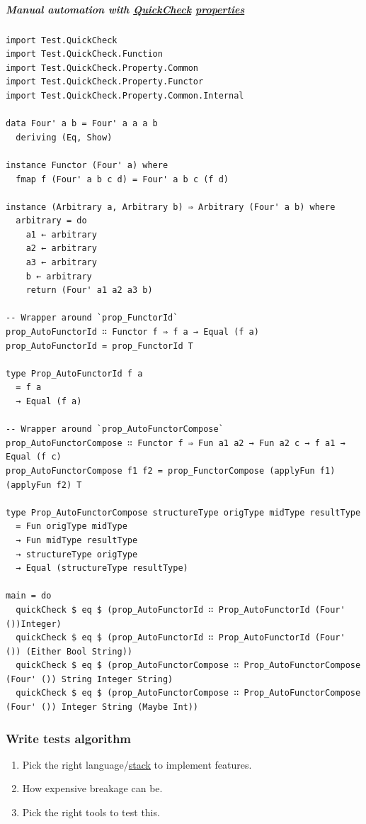 \documentclass[11pt]{article}
\begin{document}
\subparagraph{Manual automation with \hyperref[org85396c2]{QuickCheck} \hyperref[org763ad6b]{properties}}
\label{sec:orgbd34e88}

\begin{verbatim}
import Test.QuickCheck
import Test.QuickCheck.Function
import Test.QuickCheck.Property.Common
import Test.QuickCheck.Property.Functor
import Test.QuickCheck.Property.Common.Internal

data Four' a b = Four' a a a b
  deriving (Eq, Show)

instance Functor (Four' a) where
  fmap f (Four' a b c d) = Four' a b c (f d)

instance (Arbitrary a, Arbitrary b) ⇒ Arbitrary (Four' a b) where
  arbitrary = do
    a1 ← arbitrary
    a2 ← arbitrary
    a3 ← arbitrary
    b ← arbitrary
    return (Four' a1 a2 a3 b)

-- Wrapper around `prop_FunctorId`
prop_AutoFunctorId ∷ Functor f ⇒ f a → Equal (f a)
prop_AutoFunctorId = prop_FunctorId T

type Prop_AutoFunctorId f a
  = f a
  → Equal (f a)

-- Wrapper around `prop_AutoFunctorCompose`
prop_AutoFunctorCompose ∷ Functor f ⇒ Fun a1 a2 → Fun a2 c → f a1 → Equal (f c)
prop_AutoFunctorCompose f1 f2 = prop_FunctorCompose (applyFun f1) (applyFun f2) T

type Prop_AutoFunctorCompose structureType origType midType resultType
  = Fun origType midType
  → Fun midType resultType
  → structureType origType
  → Equal (structureType resultType)

main = do
  quickCheck $ eq $ (prop_AutoFunctorId ∷ Prop_AutoFunctorId (Four' ())Integer)
  quickCheck $ eq $ (prop_AutoFunctorId ∷ Prop_AutoFunctorId (Four' ()) (Either Bool String))
  quickCheck $ eq $ (prop_AutoFunctorCompose ∷ Prop_AutoFunctorCompose (Four' ()) String Integer String)
  quickCheck $ eq $ (prop_AutoFunctorCompose ∷ Prop_AutoFunctorCompose (Four' ()) Integer String (Maybe Int))
\end{verbatim}

\subsubsection{Write tests algorithm}
\label{sec:org91166c1}

\begin{enumerate}
\item Pick the right language/\hyperref[org901a5a9]{stack} to implement features.\\
\item How expensive breakage can be.\\
\item Pick the right tools to test this.\\
\end{enumerate}
\end{document}
